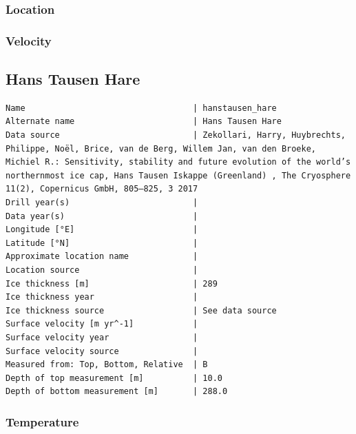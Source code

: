 \documentclass[article,a4paper,times,11pt,twoside]{article}
\begin{document}
\subsubsection{Location}
\label{sec:org9b72992}

\subsubsection{Velocity}
\label{sec:orgfabb71c}
\clearpage
\subsection{Hans Tausen Hare}
\label{sec:orgb900350}
\begin{verbatim}
Name                                  | hanstausen_hare
Alternate name                        | Hans Tausen Hare
Data source                           | Zekollari, Harry, Huybrechts, Philippe, Noël, Brice, van de Berg, Willem Jan, van den Broeke, Michiel R.: Sensitivity, stability and future evolution of the world’s northernmost ice cap, Hans Tausen Iskappe (Greenland) , The Cryosphere 11(2), Copernicus GmbH, 805–825, 3 2017 
Drill year(s)                         | 
Data year(s)                          | 
Longitude [°E]                        | 
Latitude [°N]                         | 
Approximate location name             | 
Location source                       | 
Ice thickness [m]                     | 289
Ice thickness year                    | 
Ice thickness source                  | See data source
Surface velocity [m yr^-1]            | 
Surface velocity year                 | 
Surface velocity source               | 
Measured from: Top, Bottom, Relative  | B
Depth of top measurement [m]          | 10.0
Depth of bottom measurement [m]       | 288.0
\end{verbatim}

\subsubsection{Temperature}
\label{sec:org8e7a266}
\end{document}

